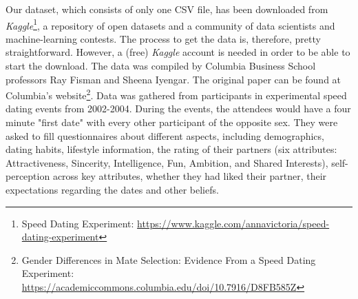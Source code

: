 
Our dataset, which consists of only one CSV file, has been downloaded from \textit{Kaggle}\footnote{Speed Dating Experiment: \url{https://www.kaggle.com/annavictoria/speed-dating-experiment}}, a repository of open datasets and a community of data scientists and machine-learning contests. The process to get the data is, therefore, pretty straightforward. However, a (free) \textit{Kaggle} account is needed in order to be able to start the download. The data was compiled by Columbia Business School professors Ray Fisman and Sheena Iyengar. The original paper can be found at Columbia's website\footnote{Gender Differences in Mate Selection: Evidence From a Speed Dating Experiment: \\\url{https://academiccommons.columbia.edu/doi/10.7916/D8FB585Z}}. Data was gathered from participants in experimental speed dating events from 2002-2004. During the events, the attendees would have a four minute "first date" with every other participant of the opposite sex. They were asked to fill questionnaires about different aspects, including demographics, dating habits, lifestyle information, the rating of their partners (six attributes: Attractiveness, Sincerity, Intelligence, Fun, Ambition, and Shared Interests), self-perception across key attributes, whether they had liked their partner, their expectations regarding the dates and other beliefs.
